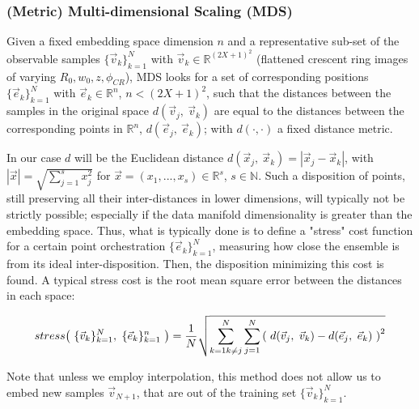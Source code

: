 \documentclass[11pt, a4paper, twoside]{article} %
\newcommand{\R}{\mathbb{R}} %
\newcommand{\N}{\mathbb{N}}
\DeclareRobustCommand{\mybox}[2][gray!10]{%
\begin{tcolorbox}[   %
        left=0.2cm,
        right=0.2cm,
        top=0.15cm,
        bottom=0.15cm,
        colback=#1,
        colframe=#1,
        width=\dimexpr\textwidth\relax, 
        enlarge left by=0mm,
        boxsep=5pt,
        arc=0pt,outer arc=0pt,
        ]
        #2
\end{tcolorbox}
}
\begin{document}
\subsubsection*{(Metric) Multi-dimensional Scaling (MDS)}\vspace{-0.1cm}
Given a fixed embedding space dimension $n$ and a representative sub-set of the observable samples $\{\vec{v}_k\}_{k=1}^{N}$ with $\vec{v}_k\in\R^{(2X+1)^2}$ (flattened crescent ring images of varying $R_0,w_0,z,\phi_{CR}$), MDS \cite{MDS} looks for a set of corresponding positions $\{ \vec{e}_k \}_{k=1}^N$ with $\vec{e}_k\in\R^n$, $n<(2X+1)^2$, such that the distances between the samples in the original space $d(\vec{v}_j,\ \vec{v}_k)$ are equal to the distances between the corresponding points in $\R^n$, $d(\vec{e}_j,\ \vec{e}_k)$; with $d(\cdot,\cdot)$ a fixed distance metric.
\mybox{ In our case $d$ will be the Euclidean distance $d(\vec{x}_j,\ \vec{x}_k)=|\vec{x}_j-\vec{x}_k|$, with $|\vec{x}|=\sqrt{\sum_{j=1}^s x_j^2}$ for $\vec{x}=(x_1,...,x_s)\in\R^s$, $s\in\N$. Such a disposition of points, still preserving all their inter-distances in lower dimensions, will typically not be strictly possible; especially if the data manifold dimensionality is greater than the embedding space. Thus, what is typically done is to define a "stress" cost function for a certain point orchestration $\{ \vec{e}_k \}_{k=1}^N$, measuring how close the ensemble is from its ideal inter-disposition. Then, the disposition minimizing this cost is found. A typical stress cost is the root mean square error between the distances in each space:}
\mybox{
\begin{equation}\small
stress\qty(\ \{\vec{v}_k\}_{k=1}^N,\ \{\vec{e}_k\}_{k=1}^n\ )=\frac{1}{N}\sqrt{\sum_{k=1\\ k\neq j}^N\sum_{j=1}^N\qty(\ d(\vec{v}_j,\ \vec{v}_k)-d(\vec{e}_j,\ \vec{e}_k)\ )^2}\vspace{-0.2cm}
\end{equation}

Note that unless we employ interpolation, this method does not allow us to embed new samples $\vec{v}_{N+1}$, that are out of the training set $\{\vec{v}_k\}_{k=1}^N$.%
}
\vspace{-0.5cm}
\end{document}

